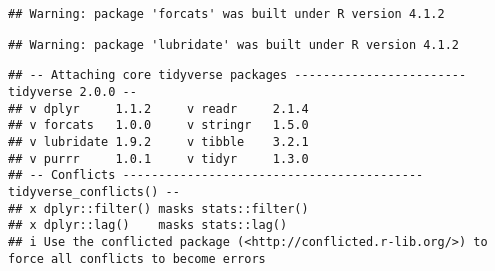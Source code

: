 \documentclass[
]{book}
\begin{document}
\begin{verbatim}
## Warning: package 'forcats' was built under R version 4.1.2
\end{verbatim}

\begin{verbatim}
## Warning: package 'lubridate' was built under R version 4.1.2
\end{verbatim}

\begin{verbatim}
## -- Attaching core tidyverse packages ------------------------ tidyverse 2.0.0 --
## v dplyr     1.1.2     v readr     2.1.4
## v forcats   1.0.0     v stringr   1.5.0
## v lubridate 1.9.2     v tibble    3.2.1
## v purrr     1.0.1     v tidyr     1.3.0
## -- Conflicts ------------------------------------------ tidyverse_conflicts() --
## x dplyr::filter() masks stats::filter()
## x dplyr::lag()    masks stats::lag()
## i Use the conflicted package (<http://conflicted.r-lib.org/>) to force all conflicts to become errors
\end{verbatim}

  
\end{document}
